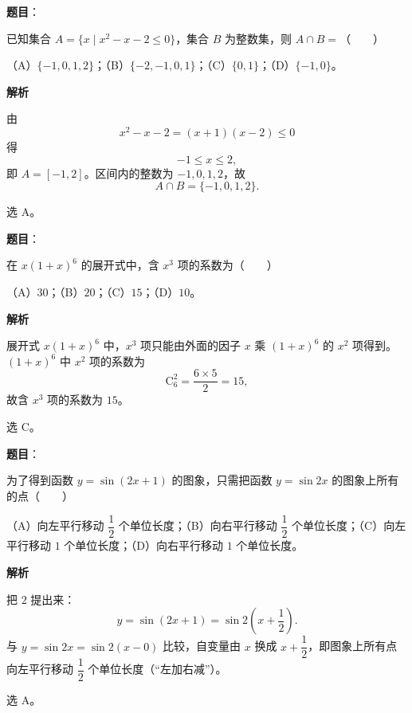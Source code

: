 

\begin{answer}

\textbf{题目}：

已知集合 $A=\{x\mid x^2-x-2\leqslant 0\}$，集合 $B$ 为整数集，则 $A\cap B=$\mbox{（　　）}

（A）$\{-1,0,1,2\}$；（B）$\{-2,-1,0,1\}$；（C）$\{0,1\}$；（D）$\{-1,0\}$。

\textbf{解析}

由
\nopagebreak[4]
\[x^2-x-2=(x+1)(x-2)\leqslant 0\]
得
\nopagebreak[4]
\[-1\leqslant x\leqslant 2,\]
即 $A=[-1,2]$。区间内的整数为 $-1,0,1,2$，故
\nopagebreak[4]
\[A\cap B=\{-1,0,1,2\}.\]

选 A。


\end{answer}
\begin{answer}

\textbf{题目}：

在 $x(1+x)^6$ 的展开式中，含 $x^3$ 项的系数为\mbox{（　　）}

（A）$30$；（B）$20$；（C）$15$；（D）$10$。

\textbf{解析}

展开式 $x(1+x)^6$ 中，$x^3$ 项只能由外面的因子 $x$ 乘 $(1+x)^6$ 的 $x^2$ 项得到。$(1+x)^6$ 中 $x^2$ 项的系数为
\nopagebreak[4]
\[\mathrm C_6^2=\frac{6\times 5}{2}=15,\]
故含 $x^3$ 项的系数为 $15$。

选 C。


\end{answer}
\begin{answer}

\textbf{题目}：

为了得到函数 $y=\sin(2x+1)$ 的图象，只需把函数 $y=\sin 2x$ 的图象上所有的点\mbox{（　　）}

（A）向左平行移动 $\dfrac12$ 个单位长度；（B）向右平行移动 $\dfrac12$ 个单位长度；（C）向左平行移动 $1$ 个单位长度；（D）向右平行移动 $1$ 个单位长度。

\textbf{解析}

把 $2$ 提出来：
\nopagebreak[4]
\[y=\sin(2x+1)=\sin 2\left(x+\frac12\right).\]
与 $y=\sin 2x=\sin 2(x-0)$ 比较，自变量由 $x$ 换成 $x+\dfrac12$，即图象上所有点向左平行移动 $\dfrac12$ 个单位长度（“左加右减”）。

选 A。


\end{answer}
